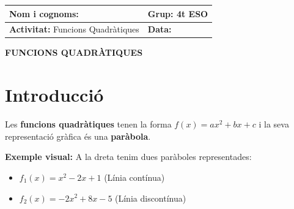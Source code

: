 \documentclass[12pt,a4paper]{article}
\begin{document}
\begingroup
\renewcommand{\arraystretch}{2.2}
\begin{tabularx}{\textwidth}{|X|p{4cm}|}
    \hline
    \textbf{Nom i cognoms:} & \textbf{Grup:} 4t ESO \\ \hline
    \textbf{Activitat:} Funcions Quadràtiques & \textbf{Data:} \\ \hline
\end{tabularx}
\endgroup

\vspace{0.5cm}

\begin{center}
    {\Large \textbf{FUNCIONS QUADRÀTIQUES}}
\end{center}

\section*{Introducció}

Les \textbf{funcions quadràtiques} tenen la forma $f(x) = ax^2 + bx + c$ i la seva representació gràfica és una \textbf{paràbola}.

\vspace{0.3cm}

\noindent \textbf{Exemple visual:}
A la dreta tenim dues paràboles representades:
\begin{itemize}
    \item $f_1(x) = x^2 - 2x + 1$ (Línia contínua)
    \item $f_2(x) = -2x^2 + 8x - 5$ (Línia discontínua)
\end{itemize}

\begin{center}
\end{center}
\end{document}
